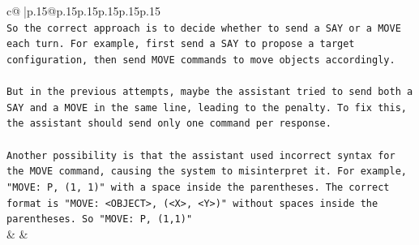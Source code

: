 \documentclass{article}
\begin{document}
{\begin{supertabular}{c@{$\;$}|p{.15\linewidth}@{}p{.15\linewidth}p{.15\linewidth}p{.15\linewidth}p{.15\linewidth}p{.15\linewidth}}
{{{\\ 
\texttt{So the correct approach is to decide whether to send a SAY or a MOVE each turn. For example, first send a SAY to propose a target configuration, then send MOVE commands to move objects accordingly.} \\
\\ 
\texttt{But in the previous attempts, maybe the assistant tried to send both a SAY and a MOVE in the same line, leading to the penalty. To fix this, the assistant should send only one command per response.} \\
\\ 
\texttt{Another possibility is that the assistant used incorrect syntax for the MOVE command, causing the system to misinterpret it. For example, "MOVE: P, (1, 1)" with a space inside the parentheses. The correct format is "MOVE: <OBJECT>, (<X>, <Y>)" without spaces inside the parentheses. So "MOVE: P, (1,1)"} \\
            }
        }
    }
    & & \\ \\


\end{supertabular}}
\end{document}
